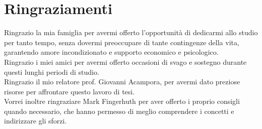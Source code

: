 



\bigskip

\begingroup
\let\clearpage\relax
\let\cleardoublepage\relax
\let\cleardoublepage\relax
\chapter*{Ringraziamenti}

Ringrazio la mia famiglia per avermi offerto l'opportunità di 
dedicarmi allo studio per tanto tempo, senza dovermi preoccupare 
di tante contingenze della vita, garantendo amore incondizionato 
e supporto economico e psicologico. \\
Ringrazio i miei amici per avermi offerto occasioni di svago 
e sostegno durante questi lunghi periodi di studio. \\
Ringrazio il mio relatore prof. Giovanni Acampora, per avermi dato 
preziose risorse per affrontare questo lavoro di tesi. \\
Vorrei inoltre ringraziare Mark Fingerhuth per aver offerto i 
proprio consigli quando necessario, che hanno permesso di 
meglio comprendere i concetti e indirizzare gli sforzi. 

\bigskip



\endgroup
